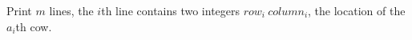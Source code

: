 Print $m$ lines, the $i$th line contains two integers $row_i\ column_i$, the location of the $a_i$th cow.

